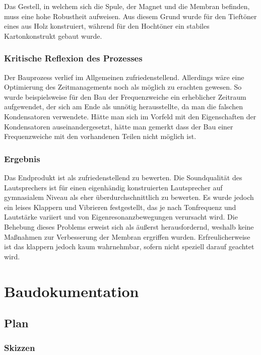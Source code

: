 \documentclass[a4paper,11pt]{report}
\begin{document}
Das Gestell, in welchem sich die Spule, der Magnet und die Membran befinden, muss eine hohe Robustheit aufweisen. Aus diesem Grund wurde für den Tieftöner eines aus Holz konstruiert, während für den Hochtöner ein stabiles Kartonkonstrukt gebaut wurde.

\section{Kritische Reflexion des Prozesses}
Der Bauprozess verlief im Allgemeinen zufriedenstellend. Allerdings wäre eine Optimierung des Zeitmanagements noch als möglich zu erachten gewesen. So wurde beispielsweise für den Bau der Frequenzweiche ein erheblicher Zeitraum aufgewendet, der sich am Ende als unnötig herausstellte, da man die falschen Kondensatoren verwendete. Hätte man sich im Vorfeld mit den Eigenschaften der Kondensatoren auseinandergesetzt, hätte man gemerkt dass der Bau einer Frequenzweiche mit den vorhandenen Teilen nicht möglich ist.

\section{Ergebnis}
Das Endprodukt ist als zufriedenstellend zu bewerten. Die Soundqualität des Lautsprechers ist für einen eigenhändig konstruierten Lautsprecher auf gymnasialem Niveau als eher überdurchschnittlich zu bewerten. Es wurde jedoch ein leises Klappern und Vibrieren festgestellt, das je nach Tonfrequenz und Lautstärke variiert und von Eigenresonanzbewegungen verursacht wird. Die Behebung dieses Problems erweist sich als äußerst herausfordernd, weshalb keine Maßnahmen zur Verbesserung der Membran ergriffen wurden. Erfreulicherweise ist das klappern jedoch kaum wahrnehmbar, sofern nicht speziell darauf geachtet wird. 


\part{Baudokumentation}

\chapter{Plan}
\section{Skizzen}
\end{document}
